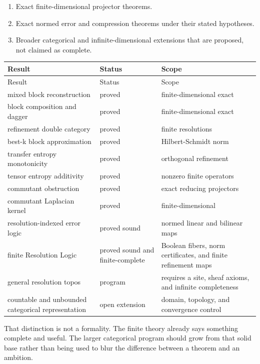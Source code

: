 \documentclass[11pt]{article}
\theoremstyle{definition}
\theoremstyle{remark}
\begin{document}
\begin{enumerate}[label=\textbf{\Alph*.}]
\item Exact finite-dimensional projector theorems.
\item Exact normed error and compression theorems under their stated hypotheses.
\item Broader categorical and infinite-dimensional extensions that are proposed, not claimed as complete.
\end{enumerate}

\begin{longtable}{L{2.05in}L{0.80in}L{2.95in}}
\toprule
Result & Status & Scope\\
\midrule
\endfirsthead
\toprule
Result & Status & Scope\\
\midrule
\endhead
mixed block reconstruction & proved & finite-dimensional exact \\
block composition and dagger & proved & finite-dimensional exact \\
refinement double category & proved & finite resolutions \\
best-k block approximation & proved & Hilbert-Schmidt norm \\
transfer entropy monotonicity & proved & orthogonal refinement \\
tensor entropy additivity & proved & nonzero finite operators \\
commutant obstruction & proved & exact reducing projectors \\
commutant Laplacian kernel & proved & finite-dimensional \\
resolution-indexed error logic & proved sound & normed linear and bilinear maps \\
finite Resolution Logic & proved sound and finite-complete & Boolean fibers, norm certificates, and finite refinement maps \\
general resolution topos & program & requires a site, sheaf axioms, and infinite completeness \\
countable and unbounded categorical representation & open extension & domain, topology, and convergence control \\
\bottomrule
\end{longtable}

That distinction is not a formality.  The finite theory already says something complete and useful.  The larger categorical program should grow from that solid base rather than being used to blur the difference between a theorem and an ambition.
\end{document}
